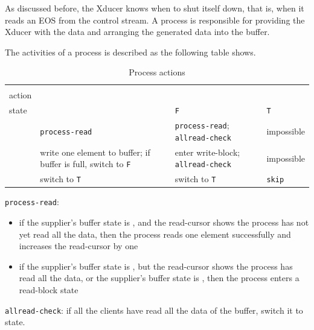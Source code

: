 As discussed before, the Xducer knows when to shut itself down, that is, when it reads an EOS from the control stream. 
A process is responsible for providing the Xducer with the data and arranging the generated data into the buffer. 

The activities of a process is described as the following table shows.


 \begin{table}[H]\large
 	\renewcommand\arraystretch{1.5}
 	\centering
 	\begin{tabular}{|l|p{}|p{}|l|}  
 		\hline
 		 \diagbox{Xducer \\ action}{Buffer \\ state} & \filling & \draining \texttt{F} & \draining \texttt{T} \\ \hline
 		\pin  & \texttt{process-read}  & \texttt{process-read}; \texttt{allread-check}  & impossible \\
 		\hline
 		\pout &  write one element to buffer;
 		if buffer is full, switch to \draining \texttt{F}    &    enter write-block; \texttt{allread-check}   & impossible \\ 
 		\hline
 		\done &  switch to \draining \texttt{T}      & switch to \draining \texttt{T}   & \texttt{skip}  \\ 
 		\hline
 	\end{tabular}
 \caption{Process actions}
 \end{table}

\texttt{process-read}:

\begin{itemize}
	\item if the supplier's buffer state is \draining, and the read-cursor shows the process has not yet read all the data, then the process reads one element successfully and increases the read-cursor by one
	\item if the supplier's buffer state is \draining, but the read-cursor shows the process has read all the data, or the supplier's buffer state is \filling, then the process enters a read-block state
\end{itemize}


\texttt{allread-check}: if all the clients have read all the data of the buffer, switch it to \filling state.


